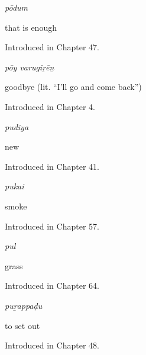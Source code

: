 \noindent\begin{minipage}[t]{\linewidth}
\raggedright
\textbf{}\enspace\emph{pōdum}\par
\small that is enough\par
\footnotesize Introduced in Chapter 47.
\end{minipage}\par\medskip

\noindent\begin{minipage}[t]{\linewidth}
\raggedright
\textbf{ }\enspace\emph{pōy varugiṟēṉ}\par
\small goodbye (lit. \textquotedblleft{}I'll go and come back\textquotedblright{})\par
\footnotesize Introduced in Chapter 4.
\end{minipage}\par\medskip

\noindent\begin{minipage}[t]{\linewidth}
\raggedright
\textbf{}\enspace\emph{pudiya}\par
\small new\par
\footnotesize Introduced in Chapter 41.
\end{minipage}\par\medskip

\noindent\begin{minipage}[t]{\linewidth}
\raggedright
\textbf{}\enspace\emph{pukai}\par
\small smoke\par
\footnotesize Introduced in Chapter 57.
\end{minipage}\par\medskip

\noindent\begin{minipage}[t]{\linewidth}
\raggedright
\textbf{}\enspace\emph{pul}\par
\small grass\par
\footnotesize Introduced in Chapter 64.
\end{minipage}\par\medskip

\noindent\begin{minipage}[t]{\linewidth}
\raggedright
\textbf{}\enspace\emph{puṟappaḍu}\par
\small to set out\par
\footnotesize Introduced in Chapter 48.
\end{minipage}\par\medskip

